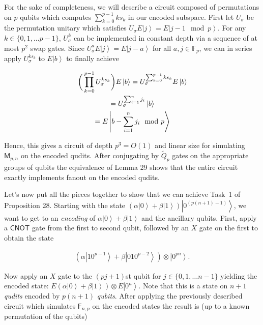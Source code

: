 \documentclass[10pt,a4paper]{article}
\begin{document}
For the sake of completeness, we will describe a circuit composed of permutations on $p$ qubits which computes $\sum_{k=0}^{p-1}ks_{k}$ in our encoded subspace. First let $U_{\sigma}$ be the permutation unitary which satisfies $U_{\sigma}E\left|j\right\rangle=E\left|j-1\mod{p}\right\rangle$. For any $k\in\{0,1,\dots p-1\}$, $U_{\sigma}^{k}$ can be implemented in constant depth via a sequence of at most $p^{2}$ swap gates. Since $U_{\sigma}^{a}E\left|j\right\rangle=E\left|j-a\right\rangle$ for all $a,j\in\mathbb{F}_{p}$, we can in series apply $U_{\sigma}^{ks_{k}}$ to $E\left|b\right\rangle$ to finally achieve\par




\[\begin{gathered}
\displaystyle\bigg{(}\prod_{k=0}^{p-1}U_{\sigma}^{ks_{k}}\bigg{)}E\left|b\right\rangle \displaystyle=U_{\sigma}^{\sum_{k=0}^{p-1}ks_{k}}E\left|b\right\rangle \\
\displaystyle=U_{\sigma}^{\sum_{i=1}^{n}j_{i}}\left|b\right\rangle \\
\displaystyle=E\left|b-\sum_{i=1}^{n}j_{i}\mod{p}\right\rangle
\end{gathered}\]


Hence, this gives a circuit of depth $p^{3}=O(1)$ and linear size for simulating $\mathsf{M}_{p,n}$ on the encoded qudits. After conjugating by $\tilde{Q}_{p}$ gates on the appropriate groups of qubits the equivalence of Lemma 29 shows that the entire circuit exactly implements fanout on the encoded qudits.\par




Let’s now put all the pieces together to show that we can achieve Task 1 of Proposition 28. Starting with the state $(\alpha\left|0\right\rangle+\beta\left|1\right\rangle)\left|0^{(p(n+1)-1)}\right\rangle$, we want to get to an \emph{encoding} of $\alpha\left|0\right\rangle+\beta\left|1\right\rangle$ and the ancillary qubits. First, apply a $\mathsf{CNOT}$ gate from the first to second qubit, followed by an $X$ gate on the first to obtain the state\par


\[\begin{gathered}
\displaystyle(\alpha\left|10^{p-1}\right\rangle+\beta\left|010^{p-2}\right\rangle)\otimes\left|0^{pn}\right\rangle.
\end{gathered}\]


Now apply an $X$ gate to the $(pj+1)$st qubit for $j\in\{0,1,\dots n-1\}$ yielding the encoded state: $E(\alpha\left|0\right\rangle+\beta\left|1\right\rangle)\otimes E\left|0^{n}\right\rangle$. Note that this is a state on $n+1$ \emph{qudits} encoded by $p(n+1)$ \emph{qubits}. After applying the previously described circuit which simulates $\mathsf{F}_{n,p}$ on the encoded states the result is (up to a known permutation of the qubits)\par
\end{document}
